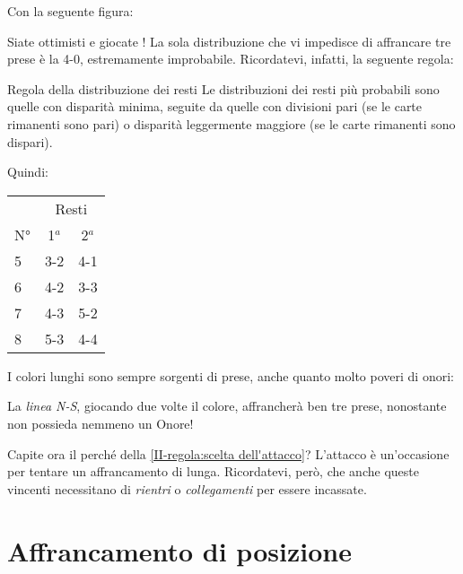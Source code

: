\documentclass[../corsofiori.tex]{subfiles}
\begin{document}
Con la seguente figura:


Siate ottimisti e giocate ! La sola distribuzione che vi impedisce di affrancare tre prese è la 4-0,
estremamente improbabile. Ricordatevi, infatti, la seguente regola:


\begin{regola}{Regola della distribuzione dei resti}
    Le distribuzioni dei resti più probabili sono quelle con disparità minima, seguite da quelle con divisioni pari (se
    le carte rimanenti sono pari) o disparità leggermente maggiore (se le carte rimanenti sono dispari).
\end{regola}

    Quindi:
    \begin{center}
    \begin{tabular}{lcc}
        \toprule
        & \multicolumn{2}{c}{Resti}\\
        \cmidrule(l){2-3}
        N°& 1$^a$ & 2$^a$ \\
        \midrule
        5 & 3-2 & 4-1\\
        6 & 4-2 & 3-3\\
        7 & 4-3 & 5-2\\
        8 & 5-3 & 4-4\\
    \end{tabular}


    \end{center}


I colori lunghi sono sempre sorgenti di prese, anche quanto molto poveri di onori:

\begin{wraptable}[6]{l}[0cm]{3cm}


\end{wraptable}

La \emph{linea N-S}, giocando due volte il colore,
affrancherà ben tre prese, nonostante non possieda nemmeno un Onore!

Capite ora il perché della \autoref{II-regola:scelta dell'attacco}? L'attacco è un'occasione per tentare un affrancamento di lunga.
Ricordatevi, però, che anche queste vincenti necessitano di \emph{rientri} o \emph{collegamenti} per essere incassate.

\newpage

\section{Affrancamento di posizione}
\end{document}
